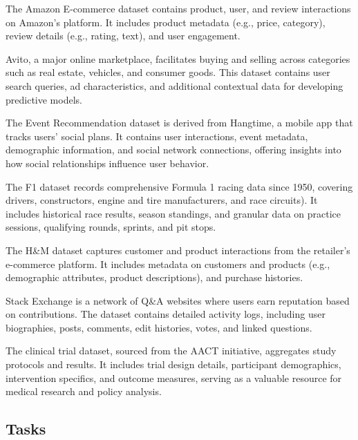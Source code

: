 \documentclass{article}
\theoremstyle{plain}
\theoremstyle{definition}
\theoremstyle{remark}
\begin{document}
\xhdr{\amazonn} The Amazon E-commerce dataset contains product, user, and review interactions on Amazon's platform. It includes product metadata (e.g., price, category), review details (e.g., rating, text), and user engagement. 

\xhdr{\avito} Avito, a major online marketplace, facilitates buying and selling across categories such as real estate, vehicles, and consumer goods. This dataset contains user search queries, ad characteristics, and additional contextual data for developing predictive models.

\xhdr{\event} The Event Recommendation dataset is derived from Hangtime, a mobile app that tracks users' social plans. It contains user interactions, event metadata, demographic information, and social network connections, offering insights into how social relationships influence user behavior.

\xhdr{\fone} The F1 dataset records comprehensive Formula 1 racing data since 1950, covering drivers, constructors, engine and tire manufacturers, and race circuits). It includes historical race results, season standings, and granular data on practice sessions, qualifying rounds, sprints, and pit stops.

\xhdr{\handm} The H\&M dataset captures customer and product interactions from the retailer’s e-commerce platform. It includes metadata on customers and products (e.g., demographic attributes, product descriptions), and purchase histories.

\xhdr{\stackex} Stack Exchange is a network of Q\&A websites where users earn reputation based on contributions. The dataset contains detailed activity logs, including user biographies, posts, comments, edit histories, votes, and linked questions. 

\xhdr{\trials} The clinical trial dataset, sourced from the AACT initiative, aggregates study protocols and results. It includes trial design details, participant demographics, intervention specifics, and outcome measures, serving as a valuable resource for medical research and policy analysis.


\subsection{Tasks}
\label{app: task}
\end{document}
